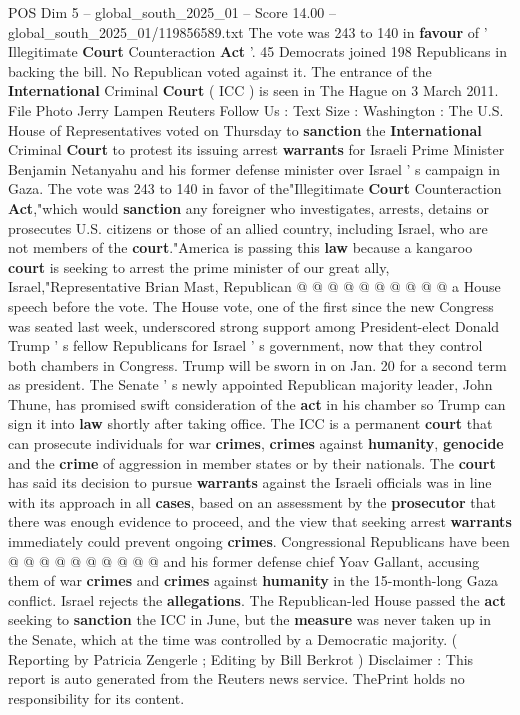 \begin{textsample}{POS Dim 5 – global\_south\_2025\_01 – Score 14.00 – global\_south\_2025\_01/119856589.txt}  \label{ex:f5_pos_354}
The vote was 243 to 140 in \textbf{favour} of ' Illegitimate \textbf{Court} Counteraction \textbf{Act} '. 45 Democrats joined 198 Republicans in backing the bill.
No Republican voted against it.
The entrance of the \textbf{International} Criminal \textbf{Court} ( ICC ) is seen in The Hague on 3 March 2011.
File Photo Jerry Lampen Reuters Follow Us : Text Size : Washington : The U.S.
House of Representatives voted on Thursday to \textbf{sanction} the \textbf{International} Criminal \textbf{Court} to protest its issuing arrest \textbf{warrants} for Israeli Prime Minister Benjamin Netanyahu and his former defense minister over Israel ' s campaign in Gaza.
The vote was 243 to 140 in favor of the"Illegitimate \textbf{Court} Counteraction \textbf{Act},"which would \textbf{sanction} any foreigner who investigates, arrests, detains or prosecutes U.S. citizens or those of an allied country, including Israel, who are not members of the \textbf{court}."America is passing this \textbf{law} because a kangaroo \textbf{court} is seeking to arrest the prime minister of our great ally, Israel,"Representative Brian Mast, Republican @ @ @ @ @ @ @ @ @ @ a House speech before the vote.
The House vote, one of the first since the new Congress was seated last week, underscored strong support among President-elect Donald Trump ' s fellow Republicans for Israel ' s government, now that they control both chambers in Congress.
Trump will be sworn in on Jan. 20 for a second term as president.
The Senate ' s newly appointed Republican majority leader, John Thune, has promised swift consideration of the \textbf{act} in his chamber so Trump can sign it into \textbf{law} shortly after taking office.
The ICC is a permanent \textbf{court} that can prosecute individuals for war \textbf{crimes}, \textbf{crimes} against \textbf{humanity}, \textbf{genocide} and the \textbf{crime} of aggression in member states or by their nationals.
The \textbf{court} has said its decision to pursue \textbf{warrants} against the Israeli officials was in line with its approach in all \textbf{cases}, based on an assessment by the \textbf{prosecutor} that there was enough evidence to proceed, and the view that seeking arrest \textbf{warrants} immediately could prevent ongoing \textbf{crimes}.
Congressional Republicans have been @ @ @ @ @ @ @ @ @ @ and his former defense chief Yoav Gallant, accusing them of war \textbf{crimes} and \textbf{crimes} against \textbf{humanity} in the 15-month-long Gaza conflict.
Israel rejects the \textbf{allegations}.
The Republican-led House passed the \textbf{act} seeking to \textbf{sanction} the ICC in June, but the \textbf{measure} was never taken up in the Senate, which at the time was controlled by a Democratic majority. ( Reporting by Patricia Zengerle ; Editing by Bill Berkrot ) Disclaimer : This report is auto generated from the Reuters news service.
ThePrint holds no responsibility for its content.

\end{textsample}
